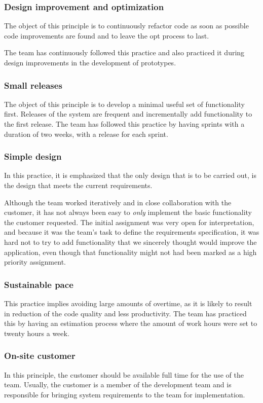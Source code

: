 \subsubsection{Design improvement and optimization}
The object of this principle is to continuously refactor code as soon as possible code improvements are found and to leave the \gls{opt} process to last. 

The team has continuously followed this practice and also practiced it during design improvements in the development of prototypes.
 
\subsubsection{Small releases}
The object of this principle is to develop a minimal useful set of functionality first. Releases of the system are frequent and incrementally add functionality to the first release. The team has followed this practice by having sprints with a duration of two weeks, with a release for each sprint.


\subsubsection{Simple design}
In this practice, it is emphasized that the only design that is to be carried out, is the design that meets the current requirements.

Although the team worked iteratively and in close collaboration with the customer, it has not always been easy to \emph{only} implement the basic functionality the customer requested. The initial assignment was very open for interpretation, and because it was the team's task to define the requirements specification, it was hard not to try to add functionality that we sincerely thought would improve the application, even though that functionality might not had been marked as a high priority assignment.


\subsubsection{Sustainable pace}
This practice implies avoiding large amounts of overtime, as it is likely to result in reduction of the code quality and less productivity. The team has practiced this by having an estimation process where the amount of work hours were set to twenty hours a week.


\subsubsection{On-site customer}
In this principle, the customer should be available full time for the use of the team. Usually, the customer is a member of the development team and is responsible for bringing system requirements to the team for implementation.


